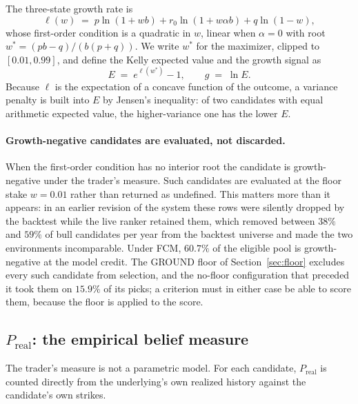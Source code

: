 \documentclass[11pt]{article}
\newcommand{\Preal}{P_{\mathrm{real}}}
\begin{document}
The three-state growth rate is
\begin{equation}
\ell(w) \;=\; p \ln(1 + wb) + r_0 \ln(1 + w\alpha b) + q \ln(1 - w),
\label{eq:kelly3}
\end{equation}
whose first-order condition is a quadratic in $w$, linear when $\alpha = 0$
with root $w^\ast = (pb - q)/(b(p+q))$. We write $w^\ast$ for the maximizer,
clipped to $[0.01, 0.99]$, and define the Kelly expected value and the growth
signal as
\begin{equation}
E \;=\; e^{\ell(w^\ast)} - 1, \qquad g \;=\; \ln E .
\label{eq:kellyev}
\end{equation}
Because $\ell$ is the expectation of a concave function of the outcome, a
variance penalty is built into $E$ by Jensen's inequality: of two candidates
with equal arithmetic expected value, the higher-variance one has the lower
$E$.

\paragraph{Growth-negative candidates are evaluated, not discarded.} When the
first-order condition has no interior root the candidate is growth-negative
under the trader's measure. Such candidates are evaluated at the floor stake
$w = 0.01$ rather than returned as undefined. This matters more than it
appears: in an earlier revision of the system these rows were silently dropped
by the backtest while the live ranker retained them, which removed between
$38\%$ and $59\%$ of bull candidates per year from the backtest universe and
made the two environments incomparable. Under FCM, $60.7\%$ of the eligible
pool is growth-negative at the model credit. The GROUND floor of
Section~\ref{sec:floor} excludes every such candidate from selection, and the
no-floor configuration that preceded it took them on $15.9\%$ of its picks; a
criterion must in either case be able to score them, because the floor is
applied to the score.

\subsection{\texorpdfstring{$\Preal$}{P-real}: the empirical belief measure}
\label{sec:preal}

The trader's measure is not a parametric model. For each candidate, $\Preal$
is counted directly from the underlying's own realized history against the
candidate's own strikes.
\end{document}
